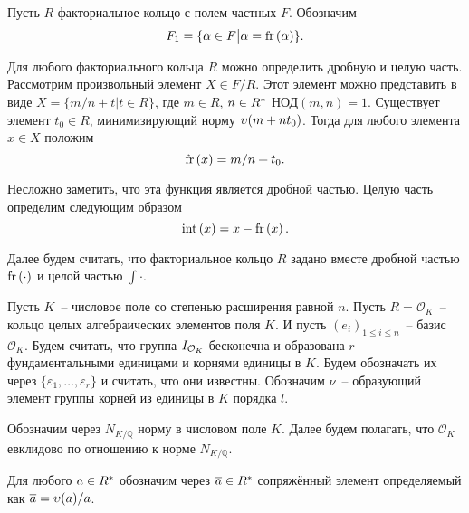 \documentclass[_00_dissertation.tex]{subfiles}
\begin{document}
\begin{definition}
    Пусть $R$ факториальное кольцо с полем частных $F$.
    Обозначим
    \begin{equation*}
        F_1 = \{
            \alpha \in F \big| \alpha = \textrm{fr}\left(\alpha\right)
        \}.
    \end{equation*}
\end{definition}

\begin{remark}\label{remark:easy_fr}
    Для любого факториального кольца $R$ можно определить дробную и целую часть.
    Рассмотрим произвольный элемент $X \in F/R$.
    Этот элемент можно представить в виде $X = \{m/n + t | t \in R\}$, где $m \in R$, $n \in R^{*}$ $\textrm{НОД}(m, n) = 1$.
    Существует элемент $t_0 \in R$, минимизирующий норму $\upsilon(m + n t_0)$.
    Тогда для любого элемента $x \in X$ положим
    \begin{equation*}
        \textrm{fr}\left(x\right) = m/n + t_0.
    \end{equation*}

    Несложно заметить, что эта функция является дробной частью.
    Целую часть определим следующим образом
    \begin{equation*}
        \textrm{int}\left(x\right) = x - \textrm{fr}\left(x\right).
    \end{equation*}
\end{remark}

Далее будем считать, что факториальное кольцо $R$ задано вместе дробной частью $\textrm{fr}\left(\cdot\right)$ и целой частью $\int{\cdot}$.


Пусть $K$~-- числовое поле со степенью расширения равной $n$.
Пусть $R = \mathcal{O}_K$~-- кольцо целых алгебраических элементов поля $K$.
И пусть $(e_i)_{1 \le i \le n}$~-- базис $\mathcal{O}_K$.
Будем считать, что группа $I_{\mathcal{O}_K}$ бесконечна и образована $r$ фундаментальными единицами и корнями единицы в $K$.
Будем обозначать их через $\{\varepsilon_1, \dots, \varepsilon_r\}$ и считать, что они известны.
Обозначим $\nu$~-- образующий элемент группы корней из единицы в $K$ порядка $l$.

Обозначим через $N_{K/\mathbb{Q}}$ норму в числовом поле $K$.
Далее будем полагать, что $\mathcal{O}_K$ евклидово по отношению к норме $N_{K/\mathbb{Q}}$.

\begin{definition}
    Для любого $a \in R^{*}$ обозначим через $\overline{a} \in R^{*}$ сопряжённый элемент определяемый как $\overline{a} = \upsilon(a)/a$.
\end{definition}
\end{document}
